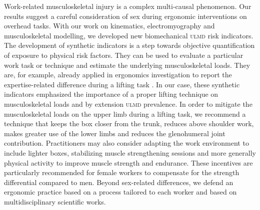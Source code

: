 Work-related musculoskeletal injury is a complex multi-causal phenomenon.
Our results suggest a careful consideration of sex during ergonomic interventions on overhead tasks.
With our work on kinematics, electromyography and musculoskeletal modelling, we developed new biomechanical \textsc{ulmd} risk indicators.
The development of synthetic indicators is a step towards objective quantification of exposure to physical risk factors.
They can be used to evaluate a particular work task or technique and estimate the underlying musculoskeletal loads.
They are, for example, already applied in ergonomics investigation to report the expertise-related difference during a lifting task \cite{goubault-evsn}.
In our case, these synthetic indicators emphasized the importance of a proper lifting technique on musculoskeletal loads and by extension \textsc{ulmd} prevalence.
In order to mitigate the musculoskeletal loads on the upper limb during a lifting task, we recommend a technique that keeps the box closer from the trunk, reduces above shoulder work, makes greater use of the lower limbs and reduces the glenohumeral joint contribution.
Practitioners may also consider adapting the work environment to include lighter boxes, stabilizing muscle strengthening sessions and more generally physical activity to improve muscle strength and endurance.
These incentives are particularly recommended for female workers to compensate for the strength differential compared to men.
Beyond sex-related differences, we defend an ergonomic practice based on a process tailored to each worker and based on multidisciplinary scientific works.